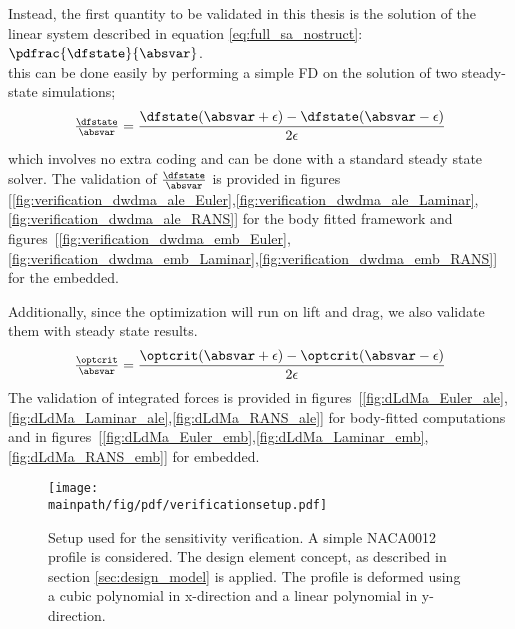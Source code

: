 \documentclass[../main.tex]{subfiles}
\begin{document}
Instead, the first quantity to be validated in this thesis is the solution of the linear system described in equation \eqref{eq:full_sa_nostruct}: $\pdfrac{\dfstate}{\absvar}$.\\
this can be done easily by performing a simple \ac{FD} on the solution of two steady-state simulations;
\begin{align}
\tfrac{\dfstate}{\absvar}=\frac{\dfstate(\absvar+\epsilon)-\dfstate(\absvar-\epsilon)}{2 \epsilon}
\end{align}
which involves no extra coding and can be done with a standard steady state solver.
The validation of $\tfrac{\dfstate}{\absvar}$ is provided in figures [\ref{fig:verification_dwdma_ale_Euler},\ref{fig:verification_dwdma_ale_Laminar},\ref{fig:verification_dwdma_ale_RANS}] for the body fitted framework and figures~[\ref{fig:verification_dwdma_emb_Euler},\ref{fig:verification_dwdma_emb_Laminar},\ref{fig:verification_dwdma_emb_RANS}] for the embedded.

Additionally, since the optimization will run on lift and drag, we also validate them with steady state results.
\begin{align}
\tfrac{\optcrit}{\absvar}=\frac{\optcrit(\absvar+\epsilon)-\optcrit(\absvar-\epsilon)}{2 \epsilon}
\end{align}
The validation of integrated forces is provided in figures~[\ref{fig:dLdMa_Euler_ale},\ref{fig:dLdMa_Laminar_ale},\ref{fig:dLdMa_RANS_ale}] for body-fitted computations and in figures~[\ref{fig:dLdMa_Euler_emb},\ref{fig:dLdMa_Laminar_emb},\ref{fig:dLdMa_RANS_emb}] for embedded.



\begin{figure}
\centering
\texttt{[image: \\mainpath/fig/pdf/verificationsetup.pdf]}
\caption[Verification setup]{Setup used for the sensitivity verification. A simple NACA0012 profile is considered. The design element concept, as described in section \ref{sec:design_model} is applied. The profile is deformed using a cubic polynomial in x-direction and a linear polynomial in y-direction.}
\label{fig:verification_setup}
\end{figure}
\end{document}

